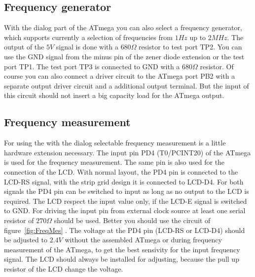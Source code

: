 \subsection{Frequency generator}

With the dialog part of the ATmega you can also select a frequency generator, which supports
currently a selection of frequencies from \(1Hz\) up to \(2MHz\).
The output of the \(5V\) signal is done with a \(680\Omega\) resistor to test port TP2.
You can use the GND signal from the minus pin of the zener diode extension or the test port TP1.
The test port TP3 is connected to GND with a \(680\Omega\) resistor.
Of course you can also connect a driver circuit to the ATmega port PB2 with a separate output
driver circuit and a additional output terminal. But the input of this circuit should not insert a
big capacity load for the ATmega output.

\subsection{Frequency measurement}
\label{sec:frequency_counter}

For using the with the dialog selectable frequency measurement is a little hardware extension
necessary. The input pin PD4 (T0/PCINT20) of the ATmega is used for the frequency measurement.
The same pin is also used for the connection of the LCD. With normal layout, the PD4 pin is connected
to the LCD-RS signal, with the strip grid design it is connected to LCD-D4.
For both signals the PD4 pin can be switched to input as long as no output to the LCD is
required. The LCD respect the input value only, if the LCD-E signal is switched to GND.
For driving the input pin from external clock source at least one serial resistor of \(270\Omega\) should be used.
Better you should use the circuit of figure~\ref{fig:FreqMes} .
The voltage at the PD4 pin (LCD-RS or LCD-D4) should be adjusted to \(2.4V\) without the assembled ATmega
or during frequency measurement of the ATmega, to get the best sensivity for the input frequency signal.
The LCD should always be installed for adjusting, because the pull up resistor of the LCD change the voltage.


